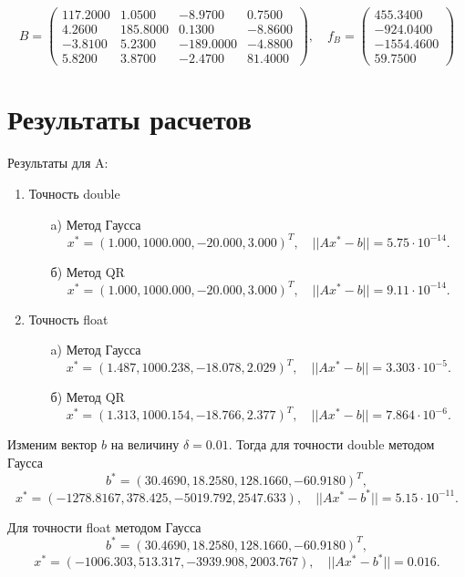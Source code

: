 \documentclass[12pt, a4paper]{article}
\begin{document}
\[
    B = 
    \begin{pmatrix}
        117.2000 &    1.0500   &    -8.9700 &    0.7500 \\
        4.2600  &    185.8000   &   0.1300 &   -8.8600  \\
        -3.8100  &    5.2300  &  -189.0000  &  -4.8800  \\
        5.8200  &      3.8700  &   -2.4700   &    81.4000   
    \end{pmatrix}, \quad f_{B} = 
    \begin{pmatrix}
       455.3400 \\
       -924.0400  \\
      -1554.4600  \\
        59.7500
    \end{pmatrix}
\]

\newpage

\section{Результаты расчетов}
Результаты для A:
\begin{enumerate}
\item Точность double
	\begin{enumerate}
	\item[a)] Метод Гаусса
	$$x^* = (1{.}000 , 1000{.}000, -20{.}000 ,3{.}000)^{T},\quad ||Ax^{*}-b|| = 5{.}75\cdot10^{-14}.$$
	\item[б)] Метод QR
	$$x^* = (1{.}000 , 1000{.}000, -20{.}000 ,3{.}000)^{T},\quad ||Ax^{*}-b|| = 9{.}11\cdot10^{-14}.$$
	\end{enumerate}
\item Точность float
	\begin{enumerate}
	\item[a)] Метод Гаусса
	$$x^* = (1{.}487 , 1000{.}238, -18{.}078 ,2{.}029)^{T},\quad ||Ax^{*}-b|| = 3{.}303\cdot10^{-5}.$$
	\item[б)] Метод QR
$$x^* = (1{.}313 , 1000{.}154, -18{.}766 ,2{.}377)^{T},\quad ||Ax^{*}-b|| = 7{.}864\cdot10^{-6}.$$
	\end{enumerate}
\end{enumerate}
Изменим вектор $b$ на величину $\delta = 0.01$. Тогда для точности double методом Гаусса
$$b^* = (30.4690, 18{.}2580, 128{.}1660, -60{.}9180)^T,$$
$$x^* = (-1278{.}8167, 378{.}425, -5019{.}792, 2547{.}633), \quad ||Ax^{*}-b^*|| =  5{.}15\cdot10^{-11}.$$

Для точности float методом Гаусса
$$b^* = (30.4690, 18{.}2580, 128{.}1660, -60{.}9180)^T,$$
$$x^* = (-1006{.}303, 513{.}317, -3939{.}908, 2003{.}767), \quad ||Ax^{*}-b^*|| =  0{.}016.$$
\end{document}
